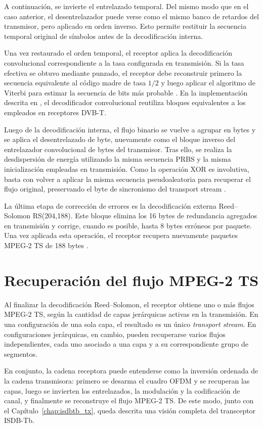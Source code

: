 A continuación, se invierte el entrelazado temporal. Del mismo modo que en el caso anterior, el desentrelazador puede verse como el mismo banco de retardos del transmisor, pero aplicado en orden inverso. Esto permite restituir la secuencia temporal original de símbolos antes de la decodificación interna.

Una vez restaurado el orden temporal, el receptor aplica la decodificación convolucional correspondiente a la tasa configurada en transmisión. Si la tasa efectiva se obtuvo mediante punzado, el receptor debe reconstruir primero la secuencia equivalente al código madre de tasa \(1/2\) y luego aplicar el algoritmo de Viterbi para estimar la secuencia de bits más probable \cite{isdbt,portugues}. En la implementación descrita en \cite{uruguay_rx}, el decodificador convolucional reutiliza bloques equivalentes a los empleados en receptores DVB-T.

Luego de la decodificación interna, el flujo binario se vuelve a agrupar en bytes y se aplica el desentrelazado de byte, nuevamente como el bloque inverso del entrelazador convolucional de bytes del transmisor. Tras ello, se realiza la desdispersión de energía utilizando la misma secuencia PRBS y la misma inicialización empleadas en transmisión. Como la operación XOR es involutiva, basta con volver a aplicar la misma secuencia pseudoaleatoria para recuperar el flujo original, preservando el byte de sincronismo del transport stream \cite{isdbt,portugues}.

La última etapa de corrección de errores es la decodificación externa Reed--Solomon RS(204,188). Este bloque elimina los 16 bytes de redundancia agregados en transmisión y corrige, cuando es posible, hasta 8 bytes erróneos por paquete. Una vez aplicada esta operación, el receptor recupera nuevamente paquetes MPEG-2 TS de 188 bytes \cite{isdbt,portugues,uruguay_rx}.

\section{Recuperación del flujo MPEG-2 TS}

Al finalizar la decodificación Reed--Solomon, el receptor obtiene uno o más flujos MPEG-2 TS, según la cantidad de capas jerárquicas activas en la transmisión. En una configuración de una sola capa, el resultado es un único \textit{transport stream}. En configuraciones jerárquicas, en cambio, pueden recuperarse varios flujos independientes, cada uno asociado a una capa y a su correspondiente grupo de segmentos.

En conjunto, la cadena receptora puede entenderse como la inversión ordenada de la cadena transmisora: primero se desarma el cuadro OFDM y se recuperan las capas, luego se invierten los entrelazados, la modulación y la codificación de canal, y finalmente se reconstruye el flujo MPEG-2 TS. De este modo, junto con el Capítulo~\ref{chap:isdbtb_tx}, queda descrita una visión completa del transceptor ISDB-Tb.
